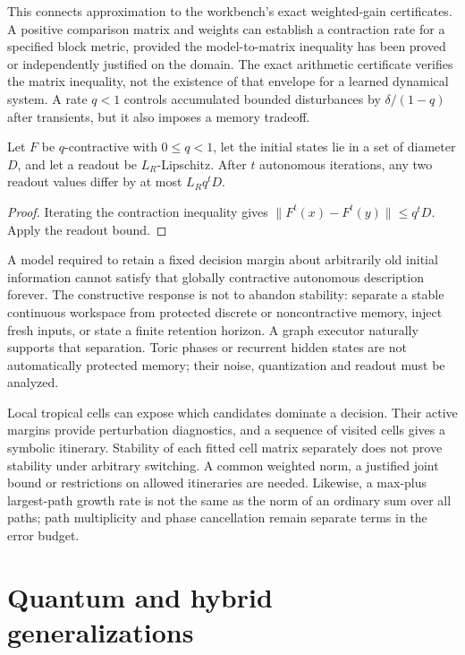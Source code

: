 This connects approximation to the workbench's exact weighted-gain certificates. A positive comparison matrix and weights can establish a contraction rate for a specified block metric, provided the model-to-matrix inequality has been proved or independently justified on the domain. The exact arithmetic certificate verifies the matrix inequality, not the existence of that envelope for a learned dynamical system. A rate $q<1$ controls accumulated bounded disturbances by $\delta/(1-q)$ after transients, but it also imposes a memory tradeoff.

\begin{proposition}
Let $F$ be $q$-contractive with $0\le q<1$, let the initial states lie in a set of diameter $D$, and let a readout be $L_R$-Lipschitz. After $t$ autonomous iterations, any two readout values differ by at most $L_Rq^tD$.
\end{proposition}
\begin{proof}
Iterating the contraction inequality gives $\|F^t(x)-F^t(y)\|\le q^tD$. Apply the readout bound.
\end{proof}

A model required to retain a fixed decision margin about arbitrarily old initial information cannot satisfy that globally contractive autonomous description forever. The constructive response is not to abandon stability: separate a stable continuous workspace from protected discrete or noncontractive memory, inject fresh inputs, or state a finite retention horizon. A graph executor naturally supports that separation. Toric phases or recurrent hidden states are not automatically protected memory; their noise, quantization and readout must be analyzed.

Local tropical cells can expose which candidates dominate a decision. Their active margins provide perturbation diagnostics, and a sequence of visited cells gives a symbolic itinerary. Stability of each fitted cell matrix separately does not prove stability under arbitrary switching. A common weighted norm, a justified joint bound or restrictions on allowed itineraries are needed. Likewise, a max-plus largest-path growth rate is not the same as the norm of an ordinary sum over all paths; path multiplicity and phase cancellation remain separate terms in the error budget.

\section{Quantum and hybrid generalizations}
\label{sec:wb-quantum-language}

